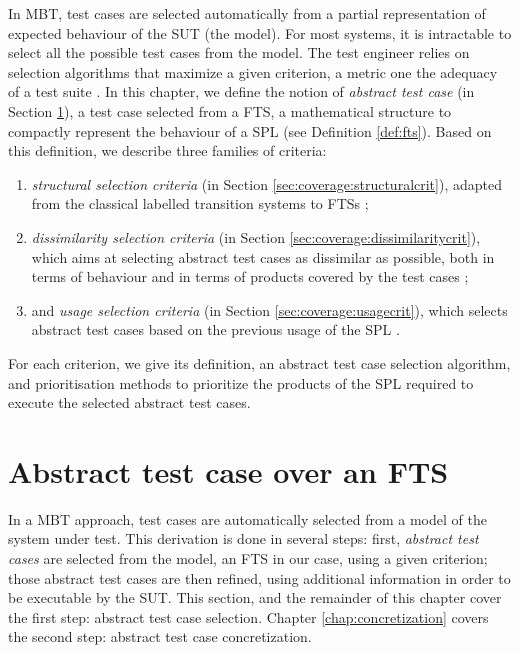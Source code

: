 
In \acrfull{MBT}, test cases are selected automatically from a partial representation of expected behaviour of the \acrfull{SUT} (\ie the model). For most systems, it is intractable to select all the possible test cases from the model. The test engineer relies on selection algorithms that maximize a given criterion, a metric one the adequacy of a test suite \cite{Mathur2008}. In this chapter, we define the notion of \emph{abstract test case} (in Section \ref{sec:coverage:asbtracttestcase}), a test case selected from a \acrfull{FTS}, a mathematical structure to compactly represent the behaviour of a SPL (see Definition \ref{def:fts}). Based on this definition, we describe  three families of criteria: 
\begin{enumerate}
\item \emph{structural selection criteria} (in Section \ref{sec:coverage:structuralcrit}), adapted from the classical \glspl{labelled transition system} to \glspl{FTS} \cite{Devroey2014e};
\item \emph{dissimilarity selection criteria} (in Section \ref{sec:coverage:dissimilaritycrit}), which aims at selecting abstract test cases as dissimilar as possible, both in terms of behaviour and in terms of products covered by the test cases \cite{Devroey2016};
\item and \emph{usage selection criteria} (in Section \ref{sec:coverage:usagecrit}), which selects abstract test cases based on the previous usage of the \gls{SPL} \cite{Devroey2015a,Devroey2014}.
\end{enumerate}
For each criterion, we give its definition, an abstract test case selection algorithm, and prioritisation methods to prioritize the products of the \gls{SPL} required to execute the selected abstract test cases.


\section{Abstract test case over an FTS}

\label{sec:coverage:asbtracttestcase}

In a \gls{MBT} approach, test cases are automatically selected from a model of the system under test. This derivation is done in several steps: first, \emph{\glspl{abstract test case}} are selected from the model, an FTS in our case, using a given criterion; those abstract test cases are then refined, using additional information in order to be executable by the \gls{SUT}. This section, and the remainder of this chapter cover the first step: abstract test case selection. Chapter \ref{chap:concretization} covers the second step: abstract test case concretization.

